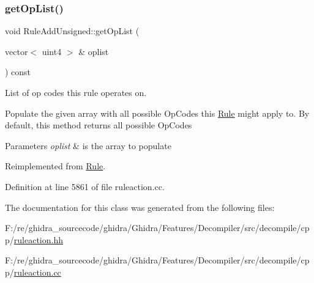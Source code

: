 \subsubsection{\texorpdfstring{getOpList()}{getOpList()}}
{\footnotesize\ttfamily void Rule\+Add\+Unsigned\+::get\+Op\+List (\begin{DoxyParamCaption}\item[{vector$<$ uint4 $>$ \&}]{oplist }\end{DoxyParamCaption}) const\hspace{0.3cm}{\ttfamily [virtual]}}



List of op codes this rule operates on. 

Populate the given array with all possible Op\+Codes this \mbox{\hyperlink{class_rule}{Rule}} might apply to. By default, this method returns all possible Op\+Codes 
\begin{DoxyParams}{Parameters}
{\em oplist} & is the array to populate \\
\hline
\end{DoxyParams}


Reimplemented from \mbox{\hyperlink{class_rule_a4023bfc7825de0ab866790551856d10e}{Rule}}.



Definition at line 5861 of file ruleaction.\+cc.



The documentation for this class was generated from the following files\+:\begin{DoxyCompactItemize}
\item 
F\+:/re/ghidra\+\_\+sourcecode/ghidra/\+Ghidra/\+Features/\+Decompiler/src/decompile/cpp/\mbox{\hyperlink{ruleaction_8hh}{ruleaction.\+hh}}\item 
F\+:/re/ghidra\+\_\+sourcecode/ghidra/\+Ghidra/\+Features/\+Decompiler/src/decompile/cpp/\mbox{\hyperlink{ruleaction_8cc}{ruleaction.\+cc}}\end{DoxyCompactItemize}
